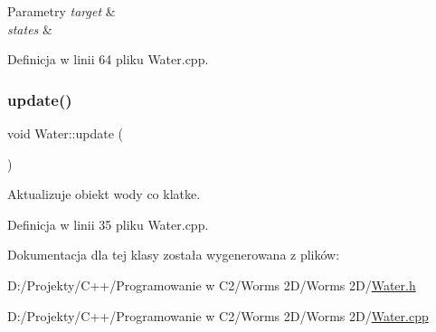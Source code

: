 \begin{DoxyParams}{Parametry}
{\em target} & \\
\hline
{\em states} & \\
\hline
\end{DoxyParams}


Definicja w linii 64 pliku Water.\+cpp.

\mbox{\label{class_water_a18fce2c0b2c45ee4ea8e413fcb4bdafa}} 
\subsubsection{\texorpdfstring{update()}{update()}}
{\footnotesize\ttfamily void Water\+::update (\begin{DoxyParamCaption}{ }\end{DoxyParamCaption})}



Aktualizuje obiekt wody co klatke. 



Definicja w linii 35 pliku Water.\+cpp.



Dokumentacja dla tej klasy została wygenerowana z plików\+:\begin{DoxyCompactItemize}
\item 
D\+:/\+Projekty/\+C++/\+Programowanie w C2/\+Worms 2\+D/\+Worms 2\+D/\mbox{\hyperlink{_water_8h}{Water.\+h}}\item 
D\+:/\+Projekty/\+C++/\+Programowanie w C2/\+Worms 2\+D/\+Worms 2\+D/\mbox{\hyperlink{_water_8cpp}{Water.\+cpp}}\end{DoxyCompactItemize}
